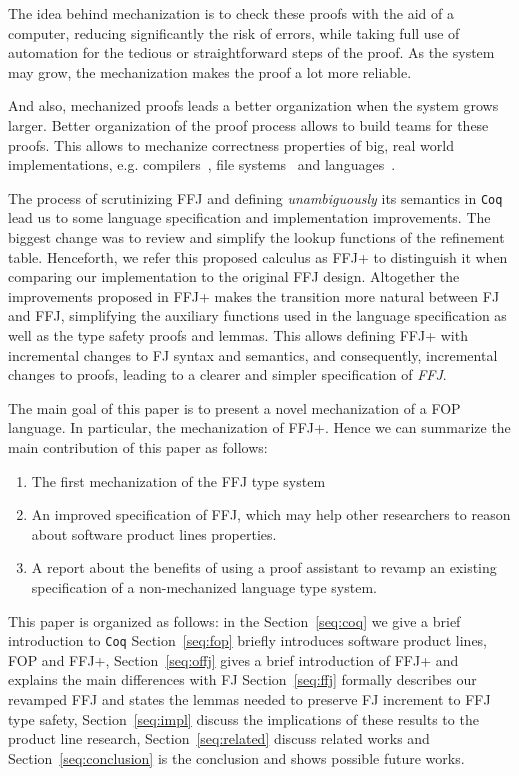 The idea behind mechanization is to check these proofs with the aid of a computer, reducing significantly the risk of errors, while 
taking full use of automation for the tedious or straightforward steps of the proof. As the system may grow, the mechanization makes
the proof a lot more reliable.

And also, mechanized proofs leads a better organization when the system grows larger.
Better organization of the proof process allows to build teams for these proofs. 
This allows to mechanize correctness properties of big, real world implementations, e.g. compilers~\cite{leroy2012compcert}, 
file systems~\cite{arkoudas2004verifying, amani2015specifying} and languages~\cite{hartel2000formalising, klein2006machine}. 

The process of scrutinizing \gls{FFJ} and defining \textit{unambiguously} its semantics in \texttt{Coq} 
lead us to some language specification and implementation improvements. The biggest change was to review and
simplify the lookup functions of the refinement table.
Henceforth, we refer this proposed calculus as \gls{FFJ+} to distinguish it when comparing our implementation to the original \gls{FFJ} design.
Altogether the improvements proposed in \gls{FFJ+} makes the transition more natural between \gls{FJ} and \gls{FFJ}, 
simplifying the auxiliary functions used in the language specification as well as the type safety proofs and lemmas. 
This allows defining \gls{FFJ+} with incremental changes to \gls{FJ} syntax and semantics, 
and consequently, incremental changes to proofs, leading to a clearer and simpler specification of \textit{FFJ}.


The main goal of this paper is to present a novel mechanization of a \gls{FOP} language. In particular, the mechanization of \gls{FFJ+}.
Hence we can summarize the main contribution of this paper as follows:
\begin{enumerate}
    \item The first mechanization of the \gls{FFJ} type system
    \item An improved specification of \gls{FFJ}, which may help other researchers to reason about software product lines properties.
    \item A report about the benefits of using a proof assistant to revamp an existing specification of a non-mechanized language type system.
\end{enumerate}

This paper is organized as follows: in the Section~\ref{seq:coq} we give a brief introduction to \texttt{Coq} 
Section~\ref{seq:fop} briefly introduces software product lines, \gls{FOP} and \gls{FFJ+},
Section~\ref{seq:offj} gives a brief introduction of  \gls{FFJ+} and explains the main differences with \gls{FJ}
Section~\ref{seq:ffj} formally describes our revamped \gls{FFJ} and states the lemmas needed to preserve \gls{FJ} increment to \gls{FFJ} type safety, 
Section~\ref{seq:impl} discuss the implications of these results to the product line research,
Section~\ref{seq:related} discuss related works and
Section~\ref{seq:conclusion} is the conclusion and shows possible future works.
